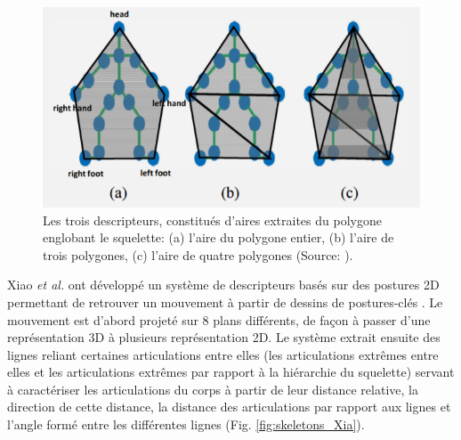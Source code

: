 \begin{figure}
    \centering
    \includegraphics[width=\textwidth]{pictures/polygons_areas.png}
    \caption[Aires extraites du polygone du squelette \parencite{Sakurai2015Ros}]{Les trois descripteurs, constitués d'aires extraites du polygone englobant le squelette: (a) l'aire du polygone entier, (b) l'aire de trois polygones, (c) l'aire de quatre polygones (Source: \parencite{Sakurai2015Ros}).}
    \label{fig:polygons_areas}
\end{figure}

Xiao \textit{et al.} ont développé un système de descripteurs basés sur des postures 2D permettant de retrouver un mouvement à partir de dessins de postures-clés \parencite{Xiao2015Sbh}. Le mouvement est d'abord projeté sur 8 plans différents, de façon à passer d'une représentation 3D à plusieurs représentation 2D. Le système extrait ensuite des lignes reliant certaines articulations entre elles (les articulations extrêmes entre elles et les articulations extrêmes par rapport à la hiérarchie du squelette) servant à caractériser les articulations du corps à partir de leur distance relative, la direction de cette distance, la distance des articulations par rapport aux lignes et l'angle formé entre les différentes lignes (Fig. \ref{fig:skeletons_Xia}).

